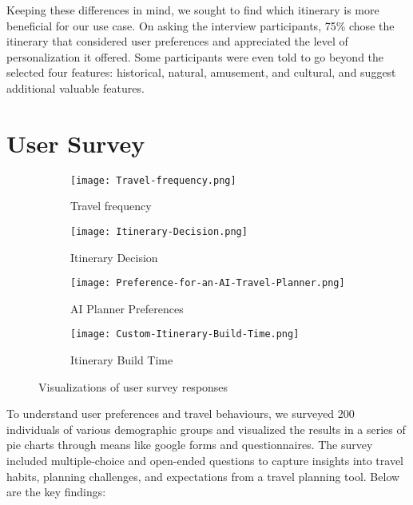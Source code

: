 \documentclass[final,1p,times]{elsarticle}
\begin{document}
        Keeping these differences in mind, we sought to find which itinerary is more beneficial for our use case. On asking the interview participants, 75\% chose the itinerary that considered user preferences and appreciated the level of personalization it offered. Some participants were even told to go beyond the selected four features: historical, natural, amusement, and cultural, and suggest additional valuable features.

\section{User Survey}
    
\begin{figure}[h!]
    \centering
    \begin{subfigure}[b]{0.22\textwidth} %
        \centering
        \texttt{[image: Travel-frequency.png]} %
        \caption{Travel frequency}
        \label{fig:travel-freq}
    \end{subfigure}
    \hfill
    \begin{subfigure}[b]{0.22\textwidth} %
        \centering
        \texttt{[image: Itinerary-Decision.png]} %
        \caption{Itinerary Decision}
        \label{fig:itinerary-dec}
    \end{subfigure}
    \hfill
    \begin{subfigure}[b]{0.22\textwidth} %
        \centering
        \texttt{[image: Preference-for-an-AI-Travel-Planner.png]} %
        \caption{AI Planner Preferences}
        \label{fig:preference-planner}
    \end{subfigure}
    \hfill
    \begin{subfigure}[b]{0.22\textwidth} %
        \centering
        \texttt{[image: Custom-Itinerary-Build-Time.png]} %
        \caption{Itinerary Build Time}
        \label{fig:itinerary-time}
    \end{subfigure}
    \caption{Visualizations of user survey responses}
    \label{fig:1x4-grid-wide}
\end{figure}
    
    To understand user preferences and travel behaviours, we surveyed 200 individuals of various demographic groups and visualized the results in a series of pie charts through means like google forms and questionnaires. The survey included multiple-choice and open-ended questions to capture insights into travel habits, planning challenges, and expectations from a travel planning tool.
    Below are the key findings:
    
\end{document}
